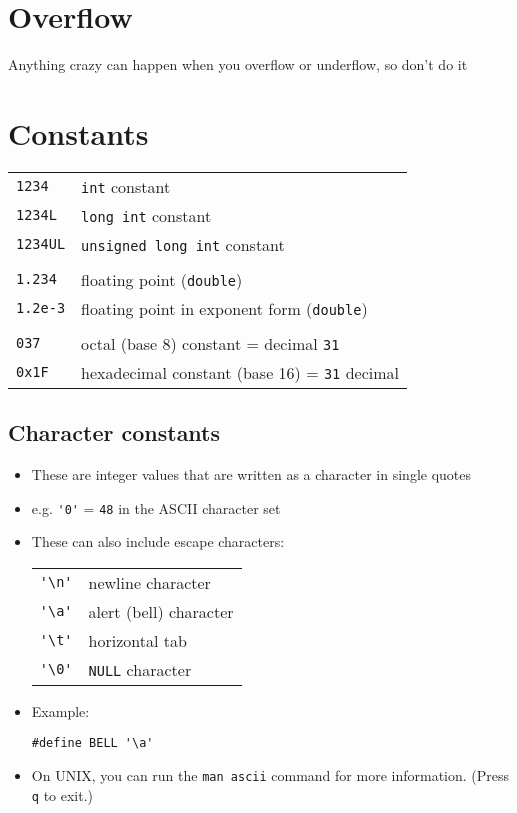 \documentclass{article}
\begin{document}
\section{Overflow}
Anything crazy can happen when you overflow or underflow, so don't do it
\section{Constants}
\begin{tabular}{ll}
\verb!1234! & \verb!int! constant\\
\verb!1234L! & \verb!long int! constant\\
\verb!1234UL! & \verb!unsigned long int! constant\\
\\
\verb!1.234! & floating point (\verb!double!)\\
\verb!1.2e-3! & floating point in exponent form (\verb!double!)\\
\\
\verb!037! & octal (base 8) constant = decimal \verb!31!\\
\verb!0x1F! & hexadecimal constant (base 16) = \verb!31! decimal
\end{tabular}


\subsection{Character constants}
\begin{itemize}
\item These are integer values that are written as a character in single quotes
\item e.g. \verb!'0'! = \verb!48! in the ASCII  character set

\item These can also include escape characters:
\begin{tabular}{ll}
\verb!'\n'! & newline character\\
\verb!'\a'! & alert (bell) character\\
\verb!'\t'! & horizontal tab\\
\verb!'\0'! & \verb!NULL! character
\end{tabular}

\item Example:
\begin{verbatim}
#define BELL '\a'
\end{verbatim}

\item On UNIX, you can run the \verb!man ascii! command for more information. (Press \verb!q! to exit.)
\end{itemize}
\end{document}

